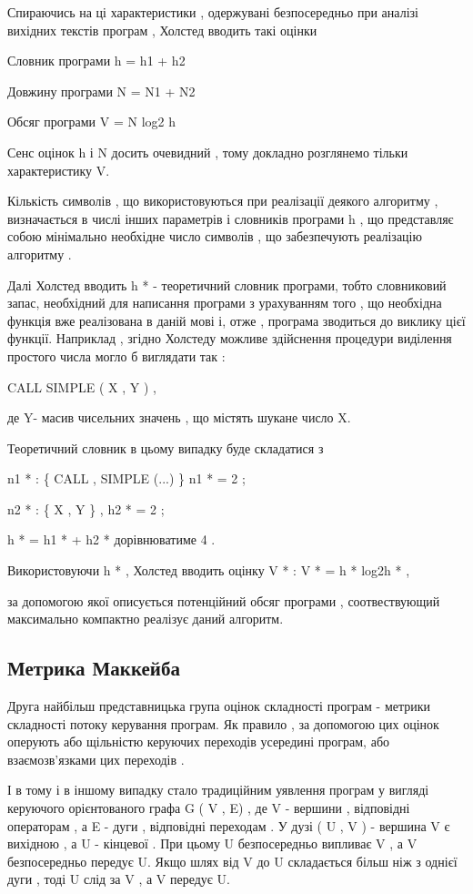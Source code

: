 \documentclass[oneside,final,14pt]{extreport}
\begin{document}
Спираючись на ці характеристики , одержувані безпосередньо при аналізі вихідних текстів програм , Холстед вводить такі оцінки

Словник програми h = h1 + h2

Довжину програми N = N1 + N2

Обсяг програми V = N log2 h

Сенс оцінок h і N досить очевидний , тому докладно розглянемо тільки характеристику V.

Кількість символів , що використовуються при реалізації деякого алгоритму , визначається в числі інших параметрів і словників програми h , що представляє собою мінімально необхідне число символів , що забезпечують реалізацію алгоритму .

Далі Холстед вводить h * - теоретичний словник програми, тобто словниковий запас, необхідний для написання програми з урахуванням того , що необхідна функція вже реалізована в даній мові і, отже , програма зводиться до виклику цієї функції. Наприклад , згідно Холстеду можливе здійснення процедури виділення простого числа могло б виглядати так :

CALL SIMPLE ( X , Y ) ,

де Y- масив чисельних значень , що містять шукане число X.

Теоретичний словник в цьому випадку буде складатися з

n1 * : \{ CALL , SIMPLE (...) \} n1 * = 2 ;

n2 * : \{ X , Y \} , h2 * = 2 ;

h * = h1 * + h2 * дорівнюватиме 4 .

Використовуючи h * , Холстед вводить оцінку V * : V * = h * log2h * ,

за допомогою якої описується потенційний обсяг програми , соотвествующий максимально компактно реалізує даний алгоритм.


\subsection{Метрика Маккейба}
\label{2section:id11}
Друга найбільш представницька група оцінок складності програм - метрики складності потоку керування програм. Як правило , за допомогою цих оцінок оперують або щільністю керуючих переходів усередині програм, або взаємозв'язками цих переходів .

І в тому і в іншому випадку стало традиційним уявлення програм у вигляді керуючого орієнтованого графа G ( V , E) , де V - вершини , відповідні операторам , а E - дуги , відповідні переходам . У дузі ( U , V ) - вершина V є вихідною , а U - кінцевої . При цьому U безпосередньо випливає V , а V безпосередньо передує U. Якщо шлях від V до U складається більш ніж з однієї дуги , тоді U слід за V , а V передує U.
\end{document}
